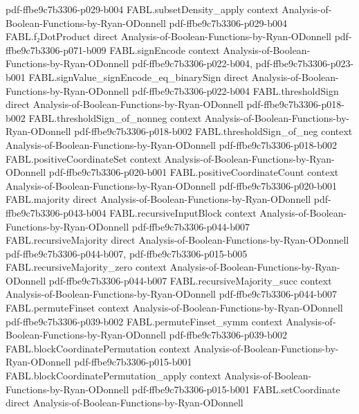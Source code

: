 \begin{theorem}
  {pdf-ffbe9c7b3306-p029-b004}
\proofstep
  {FABL.subsetDensity_apply}
  {context}
  {Analysis-of-Boolean-Functions-by-Ryan-ODonnell}
  {pdf-ffbe9c7b3306-p029-b004}
\proofstep
  {FABL.f₂DotProduct}
  {direct}
  {Analysis-of-Boolean-Functions-by-Ryan-ODonnell}
  {pdf-ffbe9c7b3306-p071-b009}
\proofstep
  {FABL.signEncode}
  {context}
  {Analysis-of-Boolean-Functions-by-Ryan-ODonnell}
  {pdf-ffbe9c7b3306-p022-b004,
    pdf-ffbe9c7b3306-p023-b001}
\proofstep
  {FABL.signValue_signEncode_eq_binarySign}
  {direct}
  {Analysis-of-Boolean-Functions-by-Ryan-ODonnell}
  {pdf-ffbe9c7b3306-p022-b004}
\proofstep
  {FABL.thresholdSign}
  {direct}
  {Analysis-of-Boolean-Functions-by-Ryan-ODonnell}
  {pdf-ffbe9c7b3306-p018-b002}
\proofstep
  {FABL.thresholdSign_of_nonneg}
  {context}
  {Analysis-of-Boolean-Functions-by-Ryan-ODonnell}
  {pdf-ffbe9c7b3306-p018-b002}
\proofstep
  {FABL.thresholdSign_of_neg}
  {context}
  {Analysis-of-Boolean-Functions-by-Ryan-ODonnell}
  {pdf-ffbe9c7b3306-p018-b002}
\proofstep
  {FABL.positiveCoordinateSet}
  {context}
  {Analysis-of-Boolean-Functions-by-Ryan-ODonnell}
  {pdf-ffbe9c7b3306-p020-b001}
\proofstep
  {FABL.positiveCoordinateCount}
  {context}
  {Analysis-of-Boolean-Functions-by-Ryan-ODonnell}
  {pdf-ffbe9c7b3306-p020-b001}
\proofstep
  {FABL.majority}
  {direct}
  {Analysis-of-Boolean-Functions-by-Ryan-ODonnell}
  {pdf-ffbe9c7b3306-p043-b004}
\proofstep
  {FABL.recursiveInputBlock}
  {context}
  {Analysis-of-Boolean-Functions-by-Ryan-ODonnell}
  {pdf-ffbe9c7b3306-p044-b007}
\proofstep
  {FABL.recursiveMajority}
  {direct}
  {Analysis-of-Boolean-Functions-by-Ryan-ODonnell}
  {pdf-ffbe9c7b3306-p044-b007,
    pdf-ffbe9c7b3306-p015-b005}
\proofstep
  {FABL.recursiveMajority_zero}
  {context}
  {Analysis-of-Boolean-Functions-by-Ryan-ODonnell}
  {pdf-ffbe9c7b3306-p044-b007}
\proofstep
  {FABL.recursiveMajority_succ}
  {context}
  {Analysis-of-Boolean-Functions-by-Ryan-ODonnell}
  {pdf-ffbe9c7b3306-p044-b007}
\proofstep
  {FABL.permuteFinset}
  {context}
  {Analysis-of-Boolean-Functions-by-Ryan-ODonnell}
  {pdf-ffbe9c7b3306-p039-b002}
\proofstep
  {FABL.permuteFinset_symm}
  {context}
  {Analysis-of-Boolean-Functions-by-Ryan-ODonnell}
  {pdf-ffbe9c7b3306-p039-b002}
\proofstep
  {FABL.blockCoordinatePermutation}
  {context}
  {Analysis-of-Boolean-Functions-by-Ryan-ODonnell}
  {pdf-ffbe9c7b3306-p015-b001}
\proofstep
  {FABL.blockCoordinatePermutation_apply}
  {context}
  {Analysis-of-Boolean-Functions-by-Ryan-ODonnell}
  {pdf-ffbe9c7b3306-p015-b001}
\proofstep
  {FABL.setCoordinate}
  {direct}
  {Analysis-of-Boolean-Functions-by-Ryan-ODonnell}

\end{theorem}

